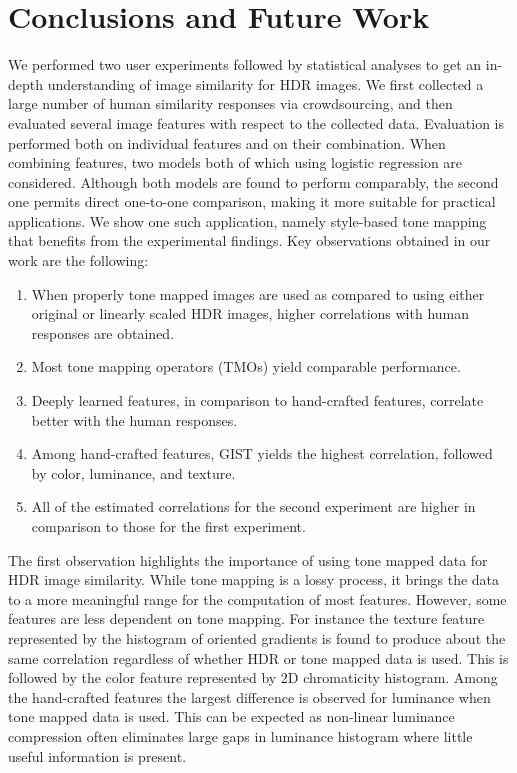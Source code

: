 \chapter{Conclusions and Future Work}
\label{chp:b6}

We performed two user experiments followed by statistical
analyses to get an in-depth understanding of image similarity for HDR
images. 
We first collected a large number of human
similarity responses via crowdsourcing, and then evaluated several  image features with respect to the collected data.
Evaluation is performed both on individual features and on their combination. When combining features,  two models both of which using logistic regression are considered.  Although both models
are found to perform comparably, the second one permits direct one-to-one comparison, making 
it more suitable for practical applications. We show one such
application, namely style-based tone mapping that benefits from the
experimental findings.
Key observations obtained in our work are the following:
%
\begin{enumerate}
\item When properly tone mapped images are used as compared to using either original or linearly scaled HDR images, higher correlations with human responses are obtained.
\item Most tone mapping operators (TMOs) yield comparable performance.
\item Deeply learned features, in comparison to hand-crafted features, correlate better with the human responses.
\item Among hand-crafted features, GIST yields the highest correlation, followed by color, luminance, and texture.
\item All of the estimated correlations for the second experiment are higher in comparison to those for the first experiment.
\end{enumerate}

The first observation highlights the importance of using tone mapped data
for HDR image similarity. While tone mapping is a lossy process, it
brings the data to a more meaningful range for the computation of most
features. However, some features are less dependent on tone mapping. For
instance the texture feature represented by the histogram of oriented
gradients is found to produce about the same correlation regardless of
whether HDR or tone mapped data is used. This is followed by the color
feature represented by 2D chromaticity histogram. Among the hand-crafted
features the largest difference is  observed for luminance
when tone mapped data is used. This can be expected as
non-linear luminance compression often eliminates large gaps in
luminance histogram where little useful information is present.

